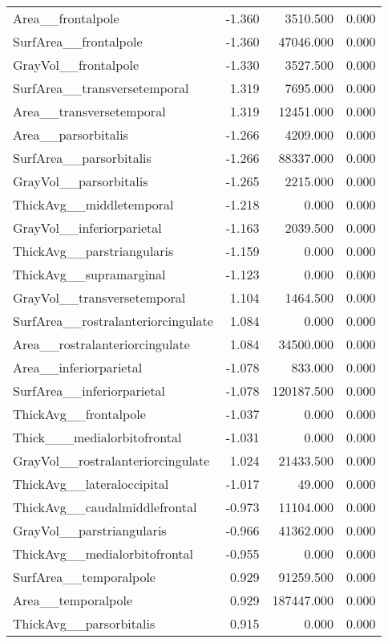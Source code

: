 \documentclass{article}
\begin{document}
\begin{table}
\begin{tabular}{lrrr}
	Area\_\_frontalpole & -1.360 & 3510.500 & 0.000 \\
	SurfArea\_\_frontalpole & -1.360 & 47046.000 & 0.000 \\
	GrayVol\_\_frontalpole & -1.330 & 3527.500 & 0.000 \\
	SurfArea\_\_transversetemporal & 1.319 & 7695.000 & 0.000 \\
	Area\_\_transversetemporal & 1.319 & 12451.000 & 0.000 \\
	Area\_\_parsorbitalis & -1.266 & 4209.000 & 0.000 \\
	SurfArea\_\_parsorbitalis & -1.266 & 88337.000 & 0.000 \\
	GrayVol\_\_parsorbitalis & -1.265 & 2215.000 & 0.000 \\
	ThickAvg\_\_middletemporal & -1.218 & 0.000 & 0.000 \\
	GrayVol\_\_inferiorparietal & -1.163 & 2039.500 & 0.000 \\
	ThickAvg\_\_parstriangularis & -1.159 & 0.000 & 0.000 \\
	ThickAvg\_\_supramarginal & -1.123 & 0.000 & 0.000 \\
	GrayVol\_\_transversetemporal & 1.104 & 1464.500 & 0.000 \\
	SurfArea\_\_rostralanteriorcingulate & 1.084 & 0.000 & 0.000 \\
	Area\_\_rostralanteriorcingulate & 1.084 & 34500.000 & 0.000 \\
	Area\_\_inferiorparietal & -1.078 & 833.000 & 0.000 \\
	SurfArea\_\_inferiorparietal & -1.078 & 120187.500 & 0.000 \\
	ThickAvg\_\_frontalpole & -1.037 & 0.000 & 0.000 \\
	Thick\_\_\_medialorbitofrontal & -1.031 & 0.000 & 0.000 \\
	GrayVol\_\_rostralanteriorcingulate & 1.024 & 21433.500 & 0.000 \\
	ThickAvg\_\_lateraloccipital & -1.017 & 49.000 & 0.000 \\
	ThickAvg\_\_caudalmiddlefrontal & -0.973 & 11104.000 & 0.000 \\
	GrayVol\_\_parstriangularis & -0.966 & 41362.000 & 0.000 \\
	ThickAvg\_\_medialorbitofrontal & -0.955 & 0.000 & 0.000 \\
	SurfArea\_\_temporalpole & 0.929 & 91259.500 & 0.000 \\
	Area\_\_temporalpole & 0.929 & 187447.000 & 0.000 \\
	ThickAvg\_\_parsorbitalis & 0.915 & 0.000 & 0.000 \\

\end{tabular}
\end{table}
\end{document}
